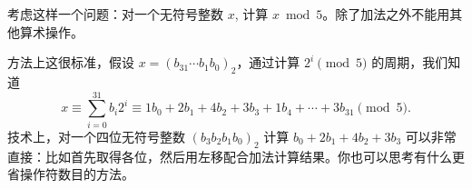     \begin{example}[算术运算]
        考虑这样一个问题：对一个无符号整数 $x$, 计算 $x \bmod 5$。除了加法之外不能用其他算术操作。

        方法上这很标准，假设 $x=(b_{31} \dotsm b_1b_0)_2$，通过计算 $2^i \pmod 5$ 的周期，我们知道
        \[ x \equiv \sum_{i=0}^{31} b_i2^i \equiv 1b_0+2b_1+4b_2+3b_3+1b_4 + \dotsb + 3b_{31} \pmod 5. \]
        技术上，对一个四位无符号整数 $(b_3b_2b_1b_0)_2$ 计算 $b_0+2b_1+4b_2+3b_3$ 可以非常直接：比如首先取得各位，然后用左移配合加法计算结果。你也可以思考有什么更省操作符数目的方法。
    \end{example}